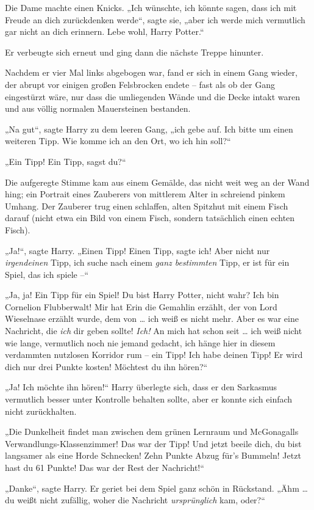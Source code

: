 {Die Dame machte einen Knicks. „Ich wünschte, ich könnte sagen, dass ich mit Freude an dich zurückdenken werde“, sagte sie, „aber ich werde mich vermutlich gar nicht an dich erinnern. Lebe wohl, Harry Potter.“

Er verbeugte sich erneut und ging dann die nächste Treppe hinunter.

Nachdem er vier Mal links abgebogen war, fand er sich in einem Gang wieder, der abrupt vor einigen großen Felsbrocken endete -- fast als ob der Gang eingestürzt wäre, nur dass die umliegenden Wände und die Decke intakt waren und aus völlig normalen Mauersteinen bestanden.

„Na gut“, sagte Harry zu dem leeren Gang, „ich gebe auf. Ich bitte um einen weiteren Tipp. Wie komme ich an den Ort, wo ich hin soll?“

„Ein Tipp! Ein Tipp, sagst du?“

Die aufgeregte Stimme kam aus einem Gemälde, das nicht weit weg an der Wand hing; ein Portrait eines Zauberers von mittlerem Alter in schreiend pinkem Umhang. Der Zauberer trug einen schlaffen, alten Spitzhut mit einem Fisch darauf (nicht etwa ein Bild von einem Fisch, sondern tatsächlich einen echten Fisch).

„Ja!“, sagte Harry. „Einen Tipp! Einen Tipp, sagte ich! Aber nicht nur \emph{irgendeinen} Tipp, ich suche nach einem \emph{ganz bestimmten} Tipp, er ist für ein Spiel, das ich spiele --“

„Ja, ja! Ein Tipp für ein Spiel! Du bist Harry Potter, nicht wahr? Ich bin Cornelion Flubberwalt! Mir hat Erin die Gemahlin erzählt, der von Lord Wieselnase erzählt wurde, dem von … ich weiß es nicht mehr. Aber es war eine Nachricht, die \emph{ich} dir geben sollte! \emph{Ich!} An mich hat schon seit … ich weiß nicht wie lange, vermutlich noch nie jemand gedacht, ich hänge hier in diesem verdammten nutzlosen Korridor rum -- ein Tipp! Ich habe deinen Tipp! Er wird dich nur drei Punkte kosten! Möchtest du ihn hören?“

„Ja! Ich möchte ihn hören!“ Harry überlegte sich, dass er den Sarkasmus vermutlich besser unter Kontrolle behalten sollte, aber er konnte sich einfach nicht zurückhalten.

„Die Dunkelheit findet man zwischen dem grünen Lernraum und McGonagalls Verwandlungs-Klassenzimmer! Das war der Tipp! Und jetzt beeile dich, du bist langsamer als eine Horde Schnecken! Zehn Punkte Abzug für's Bummeln! Jetzt hast du 61 Punkte! Das war der Rest der Nachricht!“

„Danke“, sagte Harry. Er geriet bei dem Spiel ganz schön in Rückstand. „Ähm … du weißt nicht zufällig, woher die Nachricht \emph{ursprünglich} kam, oder?“

}
